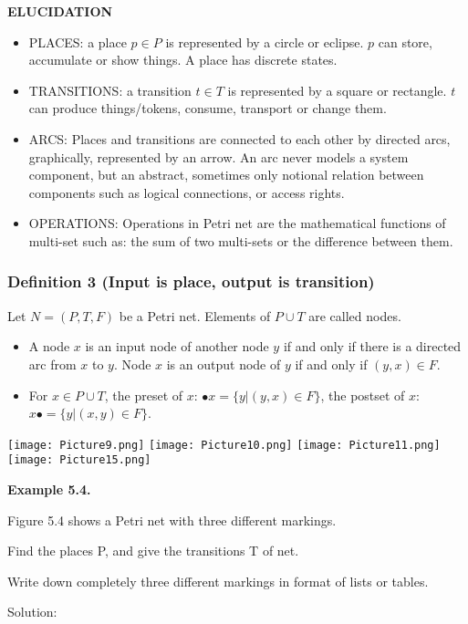 \documentclass[a4paper]{article}
\begin{document}
\textbf{ELUCIDATION}
\begin{itemize}
    \item PLACES: a place $p \in P$ is represented by a circle or eclipse. $p$ can store, accumulate or show things. A place has discrete states.
    \item TRANSITIONS: a transition $t \in T$ is represented by a square or rectangle. $t$ can produce things/tokens, consume, transport or change them.
    \item ARCS: Places and transitions are connected to each other by directed arcs, graphically, represented by an arrow. An arc never models a system component, but an abstract, sometimes only notional relation between components such as logical connections, or access rights.
    \item OPERATIONS: Operations in Petri net are the mathematical functions of multi-set such as: the sum of two multi-sets or the difference between them.
\end{itemize}

\subsubsection{Definition 3 (Input is place, output is transition)}
Let $N = (P, T, F)$ be a Petri net. Elements of $P \cup T$ are called nodes.
\begin{itemize}
    \item A node $x$ is an input node of another node $y$ if and only if there is a directed arc from $x$ to $y$. Node $x$ is an output node of $y$ if and only if $(y, x) \in F$.
    \item For $x \in P \cup T$, the preset of $x$: $\bullet x = \{y|(y, x) \in F\}$, the postset of $x$: $x\bullet = \{y|(x, y) \in F\}$.
\end{itemize}

\begin{center}
    \texttt{[image: Picture9.png]}
    \texttt{[image: Picture10.png]}
    \texttt{[image: Picture11.png]}
    \texttt{[image: Picture15.png]}
\end{center}

\vspace{1 cm}

\textbf{Example 5.4.}\par
Figure 5.4 shows a Petri net with three different markings.\par
Find the places P, and give the transitions T of net.\par
Write down completely three different markings in format of lists or tables.\par
Solution:\par
\end{document}
